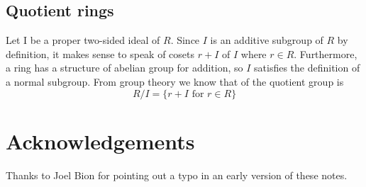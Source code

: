 \documentclass[11pt, oneside]{article}   	%
\theoremstyle{definition}
\begin{document}
\subsection{Quotient rings}
Let I be a proper two-sided ideal of $R$. Since $I$ is an additive subgroup of $R$ by definition, it makes sense to speak of cosets $r + I$ 
of $I$ where $r \in R$. Furthermore, a ring has a structure of abelian group for addition, so $I$ satisfies the definition of a normal subgroup. 
From group theory we know that of the quotient group is
\begin{equation*}
R/I = \{r + I \text{ for } r \in R\}
\end{equation*}


\bigskip
\section{Acknowledgements}
Thanks to Joel Bion for pointing out a typo in an early version of these notes.

\newpage


\end{document}
